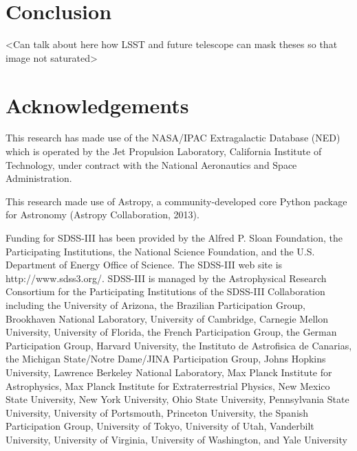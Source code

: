 \documentclass[5p]{elsarticle}
\begin{document}
 
 \section{Conclusion}
<Can talk about here how LSST and future telescope can mask theses so that image not saturated>
\section{Acknowledgements}
This research has made use of the NASA/IPAC Extragalactic Database (NED) which is operated by the Jet Propulsion Laboratory, California Institute of Technology, under contract with the National Aeronautics and Space Administration.

This research made use of Astropy, a community-developed core Python package for Astronomy (Astropy Collaboration, 2013).

Funding for SDSS-III has been provided by the Alfred P. Sloan Foundation, the Participating Institutions, the National Science Foundation, and the U.S. Department of Energy Office of Science. The SDSS-III web site is http://www.sdss3.org/. SDSS-III is managed by the Astrophysical Research Consortium for the Participating Institutions of the SDSS-III Collaboration including the University of Arizona, the Brazilian Participation Group, Brookhaven National Laboratory, University of Cambridge, Carnegie Mellon University, University of Florida, the French Participation Group, the German Participation Group, Harvard University, the Instituto de Astrofisica de Canarias, the Michigan State/Notre Dame/JINA Participation Group, Johns Hopkins University, Lawrence Berkeley National Laboratory, Max Planck Institute for Astrophysics, Max Planck Institute for Extraterrestrial Physics, New Mexico State University, New York University, Ohio State University, Pennsylvania State University, University of Portsmouth, Princeton University, the Spanish Participation Group, University of Tokyo, University of Utah, Vanderbilt University, University of Virginia, University of Washington, and Yale University

\end{document}
